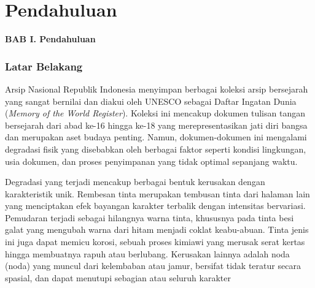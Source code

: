 \documentclass[12pt,a4paper]{book}
\begin{document}
\chapter{Pendahuluan}


\vspace{2cm}
\begin{center}
{\fontsize{14}{16.8}\selectfont\textbf{BAB I. Pendahuluan}}\\[1em]
\end{center}
\label{sec:pendahuluan}
\setcounter{section}{1}
\setcounter{subsection}{0}
\vspace{2em}
\subsection{Latar Belakang}
\label{subsec:latar-belakang}
\vspace{0.8em}
Arsip Nasional Republik Indonesia menyimpan berbagai koleksi arsip bersejarah yang sangat bernilai dan diakui oleh UNESCO sebagai Daftar Ingatan Dunia (\textit{Memory of the World Register}). Koleksi ini mencakup dokumen tulisan tangan bersejarah dari abad ke-16 hingga ke-18 yang merepresentasikan jati diri bangsa dan merupakan aset budaya penting. Namun, dokumen-dokumen ini mengalami degradasi fisik yang disebabkan oleh berbagai faktor seperti kondisi lingkungan, usia dokumen, dan proses penyimpanan yang tidak optimal sepanjang waktu.


\vspace{0.8em}
Degradasi yang terjadi mencakup berbagai bentuk kerusakan dengan karakteristik unik. Rembesan tinta merupakan tembusan tinta dari halaman lain yang menciptakan efek bayangan karakter terbalik dengan intensitas bervariasi. Pemudaran terjadi sebagai hilangnya warna tinta, khususnya pada tinta besi galat yang mengubah warna dari hitam menjadi coklat keabu-abuan. Tinta jenis ini juga dapat memicu korosi, sebuah proses kimiawi yang merusak serat kertas hingga membuatnya rapuh atau berlubang. Kerusakan lainnya adalah noda (noda) yang muncul dari kelembaban atau jamur, bersifat tidak teratur secara spasial, dan dapat menutupi sebagian atau seluruh karakter
\end{document}
